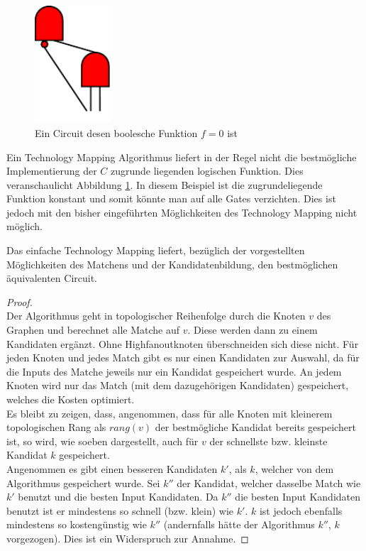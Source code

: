 \documentclass[11pt, a4paper, german]{article}
\newcommand{\TM}{Technology  Mapping }
\begin{document}
\begin{figure}
		\includegraphics[width = 2.8cm]{pictures/compiled/compl_redundant}
		\caption{Ein Circuit desen boolesche Funktion $f = 0 $ ist}
		\label{bild:compl_redundant}
\end{figure}
Ein \TM Algorithmus liefert in der Regel nicht die bestmögliche Implementierung der $C$ zugrunde liegenden logischen Funktion. Dies veranschaulicht Abbildung \ref{bild:compl_redundant}. In diesem Beispiel ist die zugrundeliegende Funktion konstant und somit könnte man auf alle Gates verzichten. Dies ist jedoch mit den bisher eingeführten Möglichkeiten des \TM nicht möglich. \\

\begin{cor}
	Das einfache \TM  liefert, bezüglich der vorgestellten Möglichkeiten des Matchens und der Kandidatenbildung, den bestmöglichen äquivalenten Circuit.
\end{cor}
\begin{proof} \ \\
	Der Algorithmus geht in topologischer Reihenfolge durch die Knoten $v$ des Graphen und berechnet alle Matche auf $v$. Diese werden dann zu einem Kandidaten ergänzt. 
 Ohne Highfanoutknoten überschneiden sich diese nicht. Für jeden Knoten und jedes Match gibt es nur einen Kandidaten zur Auswahl, da für die Inputs des Matche jeweils nur ein Kandidat gespeichert wurde. An jedem Knoten wird nur das Match (mit dem dazugehörigen Kandidaten) gespeichert, welches die Kosten optimiert. \\
 Es bleibt zu zeigen, dass, angenommen, dass für alle Knoten mit kleinerem topologischen Rang als $rang(v)$ der bestmögliche Kandidat bereits gespeichert ist, so wird, wie soeben dargestellt, auch für $v$ der schnellste bzw. kleinste Kandidat $k$ gespeichert. \\
 Angenommen es gibt einen besseren Kandidaten $k'$, als $k$, welcher von dem Algorithmus gespeichert wurde. Sei $k''$ der Kandidat, welcher dasselbe Match wie $k'$ benutzt und die besten Input Kandidaten. Da $k''$ die besten Input Kandidaten benutzt ist er mindestens so schnell (bzw. klein) wie $k'$. $k$ ist jedoch ebenfalls mindestens so kostengünstig wie $k''$ (andernfalls hätte der Algorithmus $k''$, $k$ vorgezogen). Dies ist ein Widerspruch zur Annahme. 
\end{proof}
 
\end{document}
